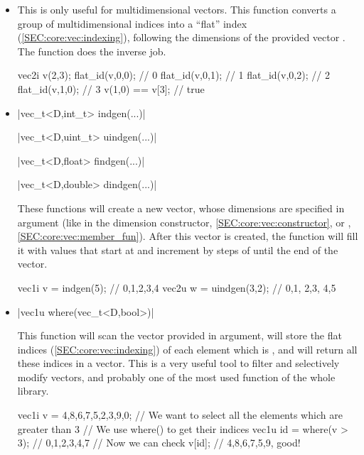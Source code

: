 \documentclass[12pt]{report}
\newenvironment{example}
{
    \begin{mdframed}[style=example,frametitle={Example}]
}
{
    \end{mdframed}
}
\begin{document}
\begin{itemize}
\item {} 

This is only useful for multidimensional vectors. This function converts a group of multidimensional indices into a ``flat'' index (\ref{SEC:core:vec:indexing}), following the dimensions of the provided vector . The  function does the inverse job.

\begin{example}
\begin{cppcode}
vec2i v(2,3);
flat_id(v,0,0); // 0
flat_id(v,0,1); // 1
flat_id(v,0,2); // 2
flat_id(v,1,0); // 3
v(1,0) == v[3]; // true
\end{cppcode}
\end{example}

\item \cppinline|vec_t<D,int_t>  indgen(...)| 

\cppinline|vec_t<D,uint_t> uindgen(...)| 

\cppinline|vec_t<D,float>  findgen(...)| 

\cppinline|vec_t<D,double> dindgen(...)| 

These functions will create a new vector, whose dimensions are specified in argument (like in the dimension constructor, \ref{SEC:core:vec:constructor}, or , \ref{SEC:core:vec:member_fun}). After this vector is created, the function will fill it with values that start at  and increment by steps of  until the end of the vector.

\begin{example}
\begin{cppcode}
vec1i v = indgen(5);    // {0,1,2,3,4}
vec2u w = uindgen(3,2); // {{0,1}, {2,3}, {4,5}}
\end{cppcode}
\end{example}

\item \cppinline|vec1u where(vec_t<D,bool>)| 

This function will scan the  vector provided in argument, will store the flat indices (\ref{SEC:core:vec:indexing}) of each element which is , and will return all these indices in a vector. This is a very useful tool to filter and selectively modify vectors, and probably one of the most used function of the whole library.

\begin{example}
\begin{cppcode}
vec1i v = {4,8,6,7,5,2,3,9,0};
// We want to select all the elements which are greater than 3
// We use where() to get their indices
vec1u id = where(v > 3); // {0,1,2,3,4,7}
// Now we can check
v[id]; // {4,8,6,7,5,9}, good!


\end{cppcode}
\end{example}
\end{itemize}
\end{document}

